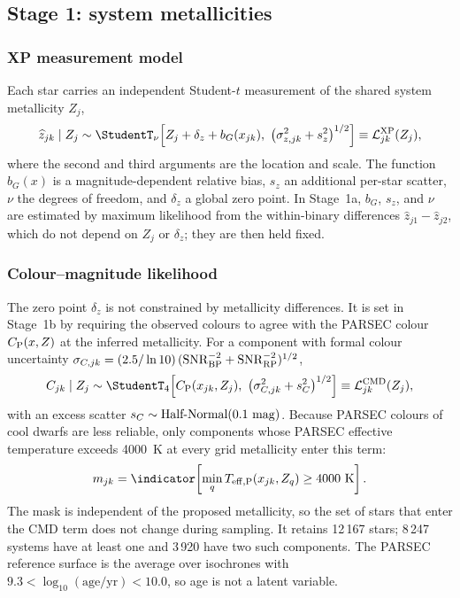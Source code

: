 \subsection{Stage 1: system metallicities}
\label{sec:stage1}

\subsubsection{XP measurement model}

Each star carries an independent Student-$t$ measurement of the shared system
metallicity $Z_j$,
\begin{equation}
 \widehat z_{jk}\mid Z_j
 \sim \StudentT_{\nu}\!\left[
 Z_j+\delta_z+b_G(x_{jk}),\
 \left(\sigma_{z,jk}^2+s_z^2\right)^{1/2}\right]
 \equiv\mathcal{L}^{\mathrm{XP}}_{jk}(Z_j),
 \label{eq:spec-model}
\end{equation}
where the second and third arguments are the location and scale.  The
function $b_G(x)$ is a magnitude-dependent relative bias, $s_z$ an additional
per-star scatter, $\nu$ the degrees of freedom, and $\delta_z$ a global zero
point.  In Stage~1a, $b_G$, $s_z$, and $\nu$ are estimated by maximum
likelihood from the within-binary differences $\widehat z_{j1}-\widehat z_{j2}$,
which do not depend on $Z_j$ or $\delta_z$; they are then held fixed.

\subsubsection{Colour--magnitude likelihood}

The zero point $\delta_z$ is not constrained by metallicity differences.  It
is set in Stage~1b by requiring the observed colours to agree with the PARSEC
colour $C_{\rm P}(x,Z)$ at the inferred metallicity.  For a component with
formal colour uncertainty
$\sigma_{C,jk}=(2.5/\ln10)\,(\mathrm{SNR}_{\rm BP}^{-2}+
\mathrm{SNR}_{\rm RP}^{-2})^{1/2}$,
\begin{equation}
 C_{jk}\mid Z_j\sim\StudentT_{4}\!\left[
 C_{\rm P}(x_{jk},Z_j),\ \left(\sigma_{C,jk}^2+s_C^2\right)^{1/2}\right]
 \equiv\mathcal{L}^{\rm CMD}_{jk}(Z_j),
 \label{eq:cmd}
\end{equation}
with an excess scatter $s_C\sim\text{Half-Normal}(0.1~{\rm mag})$.  Because
PARSEC colours of cool dwarfs are less reliable, only components whose PARSEC
effective temperature exceeds 4000~K at every grid metallicity enter this term:
\begin{equation}
 m_{jk}=\indicator\!\left[
 \min_{q}T_{\rm eff,P}(x_{jk},Z_q)\ge4000\ {\rm K}\right].
 \label{eq:warm-mask}
\end{equation}
The mask is independent of the proposed metallicity, so the set of stars that
enter the CMD term does not change during sampling.  It retains 12\,167 stars;
8\,247 systems have at least one and 3\,920 have two such components.  The
PARSEC reference surface is the average over isochrones with
$9.3<\log_{10}(\mathrm{age/yr})<10.0$, so age is not a latent variable.


